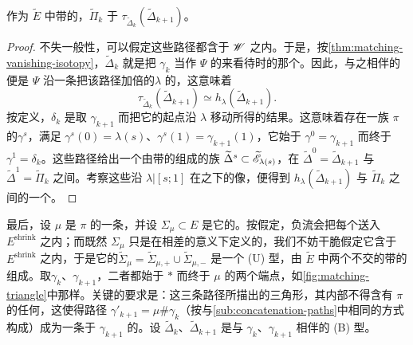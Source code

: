 \begin{lemma}\label{thm:type-b-dehn-twist-isotopy}
作为 $\widetilde{E}$ 中带\trFrame{}的\trLagrange\trSphere，$\widetilde{\Pi}_k$ \trIsotopy{}于 $\tau_{\widetilde{\Delta}_k}(\widetilde{\Delta}_{k+1})$。
\end{lemma}
\begin{proof}
不失一般性，可以假定这些路径都含于 $\mathscr{W}$ 之内。于是，按\cref{thm:matching-vanishing-isotopy}，$\widetilde{\Delta}_k$ 就是把 $\gamma_k$ 当作 $\Psi$ 的\trVanishingPath{}来看待时的那个\trVanishingCycle。因此，与之相伴的\trDehnTwist{}便是 $\Psi$ 沿一条把该路径加倍的\trLoop{}$\lambda$ 的\trMonodromy，这意味着
\begin{equation*}
\tau_{\widetilde{\Delta}_k}(\widetilde{\Delta}_{k+1})\simeq h_\lambda(\widetilde{\Delta}_{k+1}).
\end{equation*}
按定义，$\delta_k$ 是取 $\gamma_{k+1}$ 而把它的起点沿 $\lambda$ 移动所得的结果。这意味着存在一族 $\pi$ 的\trSmooth{}\trVanishingPath{}$\gamma^s$，满足 $\gamma^s(0)=\lambda(s)$、$\gamma^s(1)=\gamma_{k+1}(1)$，它始于 $\gamma^0=\gamma_{k+1}$ 而终于 $\gamma^1=\delta_k$。这些路径给出一个由带\trFrame{}的\trLagrange\trSphere{}组成的\trSmooth{}族 $\widetilde{\Delta}^s\subset\widetilde{\mathscr{E}}_{\lambda(s)}$，在 $\widetilde{\Delta}^0=\widetilde{\Delta}_{k+1}$ 与 $\widetilde{\Delta}^1=\widetilde{\Pi}_k$ 之间\trInterpolation。考察这些\trSphere{}沿 $\lambda|[s;1]$ 在\trParallelTransport{}之下的像，便得到 $h_\lambda(\widetilde{\Delta}_{k+1})$ 与 $\widetilde{\Pi}_k$ 之间的一个\trIsotopy。
\end{proof}
最后，设 $\mu$ 是 $\pi$ 的一条\trMatchingPath，并设 $\Sigma_\mu\subset E$ 是它的\trMatchingCycle。按假定，负\trLiouville{}流会把每个\trLagrange\trSubmanifold{}送入 $E^{\mathrm{shrink}}$ 之内；而既然 $\Sigma_\mu$ 只是在相差\trIsotopy{}的意义下定义的，我们不妨干脆假定它含于 $E^{\mathrm{shrink}}$ 之内，于是它的\trPreimage{}$\widetilde{\Sigma}_\mu=\widetilde{\Sigma}_{\mu,+}\cup\widetilde{\Sigma}_{\mu,-}$ 是一个 (U) 型\trLagrange\trSubmanifold，由 $\widetilde{E}$ 中两个不交的带\trFrame{}的\trLagrange\trSphere{}组成。取\trVanishingPath{}$\gamma_k$、$\gamma_{k+1}$，二者都始于 $*$ 而终于 $\mu$ 的两个端点，如\cref{fig:matching-triangle}中那样。关键的要求是：这三条路径所描出的三角形，其内部不得含有 $\pi$ 的任何\trCriticalValue，这使得\trComposition{}路径 $\gamma'_{k+1}=\mu\#\gamma_k$（按与\cref{sub:concatenation-paths}中相同的方式构成）成为一条\trIsotopy{}于 $\gamma_{k+1}$ 的\trVanishingPath。设 $\widetilde{\Delta}_k$、$\widetilde{\Delta}_{k+1}$ 是与 $\gamma_k$、$\gamma_{k+1}$ 相伴的 (B) 型\trSubmanifold。
